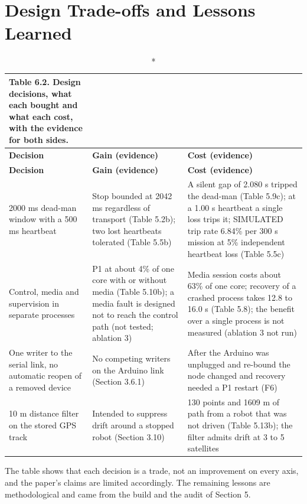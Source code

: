 \section{Design Trade-offs and Lessons Learned}

\begin{center}
\footnotesize
\begin{longtable}{|p{4cm}|p{5cm}|p{5cm}|}
\caption*{Table 6.2. Design decisions, what each bought and what each cost, with the evidence for both sides.}
\addcontentsline{lot}{table}{\protect\numberline{6.2}Design decisions, what each bought and what each cost, with the evidence for both sides.}
\\
\hline
\textbf{Decision} & \textbf{Gain (evidence)} & \textbf{Cost (evidence)} \\
\hline
\endfirsthead
\hline
\textbf{Decision} & \textbf{Gain (evidence)} & \textbf{Cost (evidence)} \\
\hline
\endhead
2000 ms dead-man window with a 500 ms heartbeat & Stop bounded at 2042 ms regardless of transport (Table 5.2b); two lost heartbeats tolerated (Table 5.5b) & A silent gap of 2.080 s tripped the dead-man (Table 5.9c); at a 1.00 s heartbeat a single loss trips it; SIMULATED trip rate 6.84\% per 300 s mission at 5\% independent heartbeat loss (Table 5.5c) \\
\hline
Control, media and supervision in separate processes & P1 at about 4\% of one core with or without media (Table 5.10b); a media fault is designed not to reach the control path (not tested; ablation 3) & Media session costs about 63\% of one core; recovery of a crashed process takes 12.8 to 16.0 s (Table 5.8); the benefit over a single process is not measured (ablation 3 not run) \\
\hline
One writer to the serial link, no automatic reopen of a removed device & No competing writers on the Arduino link (Section 3.6.1) & After the Arduino was unplugged and re-bound the node changed and recovery needed a P1 restart (F6) \\
\hline
10 m distance filter on the stored GPS track & Intended to suppress drift around a stopped robot (Section 3.10) & 130 points and 1609 m of path from a robot that was not driven (Table 5.13b); the filter admits drift at 3 to 5 satellites \\
\hline
\end{longtable}
\end{center}

The table shows that each decision is a trade, not an improvement on every axis, and the paper's claims are limited accordingly. The remaining lessons are methodological and came from the build and the audit of Section 5.

